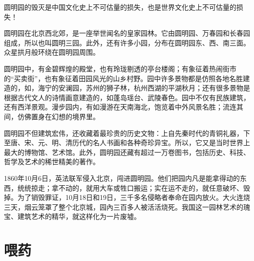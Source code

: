 \documentclass[12pt,UTF-8,openany]{ctexbook}
\begin{document}
\begin{large}
    
    圆明园的毁灭是中国文化史上不可估量的损失，也是世界文化史上不可估量的损失！
    
    圆明园在北京西北郊，是一座举世闻名的皇家园林。它由圆明园、万春园和长春园组成，所以也叫圆明三园。此外，还有许多小园，分布在圆明园东、西、南三面。众星拱月般环绕在圆明园周围。
    
    圆明园中，有金碧辉煌的殿堂，也有玲珑剔透的亭台楼阁；有象征着热闹街市的“买卖街”，也有象征着田园风光的山乡村野。园中许多景物都是仿照各地名胜建造的，如，海宁的安澜园，苏州的狮子林，杭州西湖的平湖秋月；还有很多景物是根据古代文人的诗情画意建造的，如蓬岛瑶台、武陵春色。园中不仅有民族建筑，还有西洋景观。漫步园内，有如漫游在天南海北，饱览着中外风景名胜；流连其间，仿佛置身在幻想的境界里。
    
    圆明园不但建筑宏伟，还收藏着最珍贵的历史文物：上自先秦时代的青铜礼器，下至唐、宋、元、明、清历代的名人书画和各种奇珍异宝。所以，它又是当时世界上最大的博物馆、艺术馆。此外，圆明园还藏有超过一万卷图书，包括历史、科技、哲学及艺术的稀世精美的著作。
    
    1860年10月6日，英法联军侵入北京，闯进圆明园。他们把园内凡是能拿得动的东西，统统掠走；拿不动的，就用大车或牲口搬运；实在运不走的，就任意破坏、毁掉。为了销毁罪证，10月18日和19日，三千多名侵略者奉命在园内放火。大火连烧三天，烟云笼罩了整个北京城，园內三百多人被活活烧死。我国这一园林艺术的瑰宝、建筑艺术的精华，就这样化为一片废墟。
    
\end{large}



\chapter{喂药}
\end{document}
